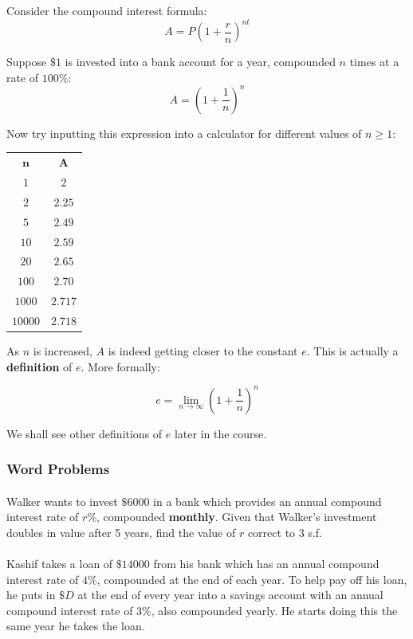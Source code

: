 \documentclass[12pt, a4paper, titlepage, twoside]{article}
\begin{document}
	\hfill
	
	\begin{fr}[$\mathbold{e}$]
		Consider the compound interest formula:
		$$A = P\left(1+\dfrac{r}{n}\right)^{nt}$$
		
		Suppose $\$1$ is invested into a bank account for a year, compounded $n$ times at a rate of $100\%$:
		$$A = \left(1+\dfrac{1}{n}\right)^n$$
		
		Now try inputting this expression into a calculator for different values of $n \geq 1$:
		
		\begin{longtable}{|c|c|}
			\hline
			$\mathbold{n}$ & $\mathbold{A}$\\
			\hhline{|=|=|}
			$1$ & $2$\\
			\hline
			$2$ & $2.25$\\
			\hline
			$5$ & $2.49$\\
			\hline
			$10$ & $2.59$\\
			\hline
			$20$ & $2.65$\\
			\hline
			$100$ & $2.70$\\
			\hline
			$1000$ & $2.717$\\
			\hline
			$10000$ & $2.718$\\
			\hline
		\end{longtable}
		
		As $n$ is increased, $A$ is indeed getting closer to the constant $e$. This is actually a \textbf{definition} of $e$. More
		formally:
		
		$$e = \lim_{n \to \infty} \left(1+\dfrac{1}{n}\right)^n$$
		
		We shall see other definitions of $e$ later in the course.		
	\end{fr}
	
	\subsubsection*{Word Problems}
	
	\paragraph{}
	 Walker wants to invest $\$6000$ in a bank which provides an annual compound interest rate of
	$r\%$, compounded \textbf{monthly}. Given that Walker's investment doubles in value after 5 years, find the value of $r$
	correct to 3 s.f.
	
	\paragraph{}
	 Kashif takes a loan of $\$\num{14000}$ from his bank which has an annual compound interest rate of
	$4\%$, compounded at the end of each year. To help pay off his loan, he puts in $\$D$ at the end of every year into a savings 
	account with an annual compound interest rate of $3\%$, also compounded yearly. He starts doing this the same year he takes the loan.
	
\end{document}
